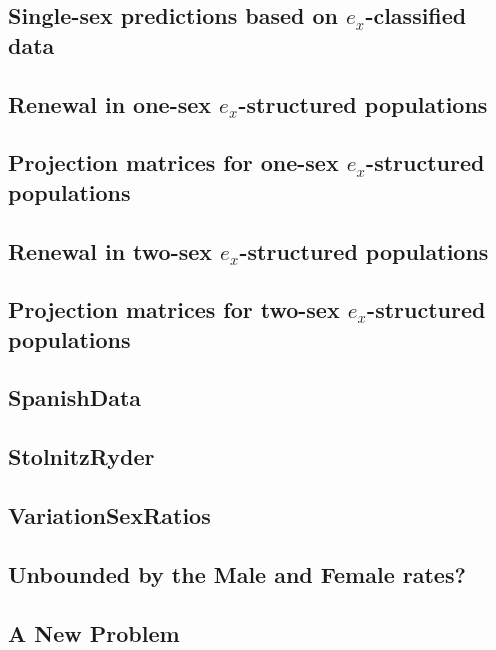\subsection{Single-sex predictions based on $e_x$-classified data}


\subsection{Renewal in one-sex $e_x$-structured populations}


\subsection{Projection matrices for one-sex $e_x$-structured populations}


\subsection{Renewal in two-sex $e_x$-structured populations}


\subsection{Projection matrices for two-sex $e_x$-structured populations}


\subsection{SpanishData}
 

\subsection{StolnitzRyder}
 

\subsection{VariationSexRatios}
 

\subsection{Unbounded by the Male and Female rates?}
 
  
\subsection{A New Problem}
 
  

